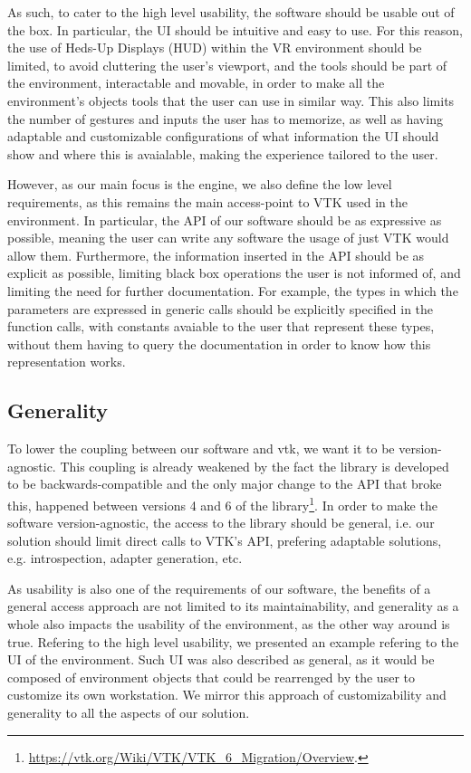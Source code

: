 As such, to cater to the high level usability, the software should be usable out of the box. In particular, the UI should be intuitive and easy to use. For this reason, the use of Heds-Up Displays (HUD) within the VR environment should be limited, to avoid cluttering the user's viewport, and the tools should be part of the environment, interactable and movable, in order to make all the environment's objects tools that the user can use in similar way. This also limits the number of gestures and inputs the user has to memorize, as well as having adaptable and customizable configurations of what information the UI should show and where this is avaialable, making the experience tailored to the user.

However, as our main focus is the engine, we also define the low level requirements, as this remains the main access-point to VTK used in the environment. In particular, the API of our software should be as expressive as possible, meaning the user can write any software the usage of just VTK would allow them. Furthermore, the information inserted in the API should be as explicit as possible, limiting black box operations the user is not informed of, and limiting the need for further documentation. For example, the types in which the parameters are expressed in generic calls should be explicitly specified in the function calls, with constants avaiable to the user that represent these types, without them having to query the documentation in order to know how this representation works.

\subsection{Generality}

To lower the coupling between our software and \acrshort{vtk}, we want it to be version-agnostic. This coupling is already weakened by the fact the library is developed to be backwards-compatible and the only major change to the API that broke this, happened between versions 4 and 6 of the library\footnote{\url{https://vtk.org/Wiki/VTK/VTK\_6\_Migration/Overview}.}. In order to make the software version-agnostic, the access to the library should be general, i.e. our solution should limit direct calls to VTK's API, prefering adaptable solutions, e.g. introspection, adapter generation, etc.

As usability is also one of the requirements of our software, the benefits of a general access approach are not limited to its maintainability, and generality as a whole also impacts the usability of the environment, as the other way around is true. Refering to the high level usability, we presented an example refering to the UI of the environment. Such UI was also described as general, as it would be composed of environment objects that could be rearrenged by the user to customize its own workstation. We mirror this approach of customizability and generality to all the aspects of our solution.

